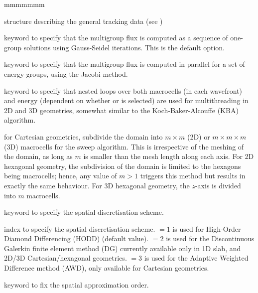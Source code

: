 \begin{ListeDeDescription}{mmmmmmm}

\item[\dstr{desctrack}] structure describing the general tracking data (see
)

\item[\moc{ONEG}] keyword to specify that the multigroup flux is computed as a sequence of one-group solutions using Gauss-Seidel iterations. This is the default option.

\item[\moc{ALLG}] keyword to specify that the multigroup flux is computed in parallel for a set of energy groups, using the Jacobi method.

\item[\moc{KBA}] keyword to specify that nested loops over both macrocells (in each wavefront) and energy (dependent on whether  or  is selected) are used for multithreading in 2D and 3D geometries, somewhat similar to the Koch-Baker-Alcouffe (KBA) algorithm.\cite{kba,domino}

\item[\dusa{m}] for Cartesian geometries, subdivide the domain into $m\times m$ (2D) or $m \times m \times m$ (3D) macrocells for the sweep algorithm. This is irrespective of the meshing of the domain, as long as $m$ is smaller than the mesh length along each axis. For 2D hexagonal geometry, the subdivision of the domain is limited to the hexagons being macrocells; hence, any value of $m>1$ triggers this method but results in exactly the same behaviour. For 3D hexagonal geometry, the $z$-axis is divided into $m$ macrocells. 

\item[\moc{SCHM}] keyword to specify the spatial discretisation scheme. 

\item[\dusa{ischm}] index to specify the spatial discretisation scheme.  $=1$ is used for High-Order Diamond Differencing (HODD) (default value).  $=2$ is used for the Discontinuous Galerkin finite element method (DG) currently available only in 1D slab, and 2D/3D Cartesian/hexagonal geometries.  $=3$ is used for the Adaptive Weighted Difference method (AWD), only available for Cartesian geometries.

\item[\moc{DIAM}] keyword to fix the spatial approximation order.


\end{ListeDeDescription}
